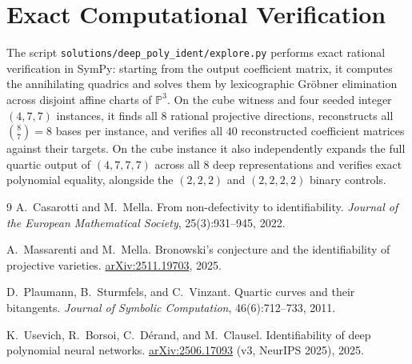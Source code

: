 \documentclass[11pt]{article}
\theoremstyle{plain}
\theoremstyle{definition}
\theoremstyle{remark}
\begin{document}
\section{Exact Computational Verification}

The script \texttt{solutions/deep\_poly\_ident/explore.py} performs exact rational verification in SymPy: starting from the output coefficient matrix, it computes the annihilating quadrics and solves them by lexicographic Gr\"obner elimination across disjoint affine charts of $\mathbb{P}^3$. On the cube witness and four seeded integer $(4,7,7)$ instances, it finds all $8$ rational projective directions, reconstructs all $\binom{8}{7} = 8$ bases per instance, and verifies all $40$ reconstructed coefficient matrices against their targets. On the cube instance it also independently expands the full quartic output of $(4,7,7,7)$ across all $8$ deep representations and verifies exact polynomial equality, alongside the $(2,2,2)$ and $(2,2,2,2)$ binary controls.

\begin{thebibliography}{9}
A.~Casarotti and M.~Mella.
From non-defectivity to identifiability.
\emph{Journal of the European Mathematical Society}, 25(3):931--945, 2022.

A.~Massarenti and M.~Mella.
Bronowski's conjecture and the identifiability of projective varieties.
\href{https://arxiv.org/abs/2511.19703}{arXiv:2511.19703}, 2025.

D.~Plaumann, B.~Sturmfels, and C.~Vinzant.
Quartic curves and their bitangents.
\emph{Journal of Symbolic Computation}, 46(6):712--733, 2011.

K.~Usevich, R.~Borsoi, C.~D\'erand, and M.~Clausel.
Identifiability of deep polynomial neural networks.
\href{https://arxiv.org/abs/2506.17093}{arXiv:2506.17093} (v3, NeurIPS 2025), 2025.
\end{thebibliography}
\end{document}

